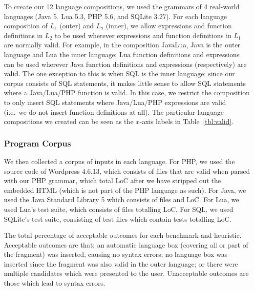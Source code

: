 \documentclass[sigplan,screen]{acmart}
\begin{document}
To create our 12 language compositions, we used the grammars of 4 real-world
languages (Java 5, Lua 5.3, PHP 5.6, and SQLite 3.27).
For each language composition of $L_1$ (outer) and $L_2$ (inner), we allow
expressions and function definitions in $L_2$ to be used wherever expressions
and function definitions in $L_1$ are normally valid. For example, in the
composition JavaLua, Java is the outer language and Lua the inner
language: Lua function definitions and expressions can be used wherever Java
function definitions and expressions (respectively) are valid. The one exception
to this is when SQL is the inner language: since our corpus consists of SQL
statements, it makes little sense to allow SQL statements where a Java/Lua/PHP
function is valid. In this case, we restrict the composition to only insert SQL
statements where Java/Lua/PHP expressions are valid (i.e.~we do not insert
function definitions at all). The
particular language compositions we created can be seen as the $x$-axis labels
in Table~\ref{tbl:valid}.


\subsubsection{Program Corpus}

We then collected a corpus of inputs in each language.
For PHP, we used the source code of Wordpress 4.6.13, which consists of \corpusphpfiles files that are
valid when parsed with our PHP grammar, which total \corpusphploc LoC after we
have stripped out the embedded HTML (which is not part of the PHP
language as such). For Java, we used the Java Standard Library 5 which consists
of \corpusjavafiles files and \corpusjavaloc LoC.
For Lua, we used Lua's test suite, which consists of \corpusluafiles files totalling \corpuslualoc LoC.
For SQL, we used SQLite's test suite, consisting of \corpussqlfiles test files which
contain \corpussqltests tests totalling \corpussqlloc LoC.

\begin{table}[tb]
    

    \vspace{7pt}
    \caption{The total percentage of acceptable outcomes for each benchmark and
      heuristic. Acceptable outcomes are that: an automatic language box
      (covering all or part of the fragment) was inserted, causing no syntax
      errors; no language box was inserted since the fragment was also valid in
      the outer language; or there were multiple candidates which were presented to the
      user. Unacceptable outcomes are those which lead to syntax errors.}
    \label{tbl:valid}
\end{table}
\end{document}
